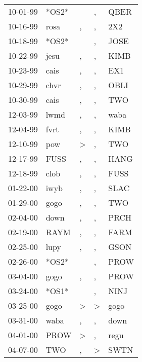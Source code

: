\begin{supertabular}{lllll}
 10-01-99 &  *OS2* &                  &                , &   QBER \\
 10-16-99 &   rosa &                , &                , &    2X2 \\
 10-18-99 &  *OS2* &                  &                , &   JOSE \\
 10-22-99 &   jesu &                , &                , &   KIMB \\
 10-23-99 &   cais &                , &                , &    EX1 \\
 10-29-99 &   chvr &                , &                , &   OBLI \\
 10-30-99 &   cais &                , &                , &    TWO \\
 12-03-99 &   lwmd &                , &                , &   waba \\
 12-04-99 &   fvrt &                , &                , &   KIMB \\
 12-10-99 &    pow &     \textgreater &                , &    TWO \\
 12-17-99 &   FUSS &                , &                , &   HANG \\
 12-18-99 &   clob &                , &                , &   FUSS \\
 01-22-00 &   iwyb &                , &                , &   SLAC \\
 01-29-00 &   gogo &                , &                , &    TWO \\
 02-04-00 &   down &                , &                , &   PRCH \\
 02-19-00 &   RAYM &                , &                , &   FARM \\
 02-25-00 &   lupy &                , &                , &   GSON \\
 02-26-00 &  *OS2* &                  &                , &   PROW \\
 03-04-00 &   gogo &                , &                , &   PROW \\
 03-24-00 &  *OS1* &                  &                , &   NINJ \\
 03-25-00 &   gogo &     \textgreater &     \textgreater &   gogo \\
 03-31-00 &   waba &                , &                , &   down \\
 04-01-00 &   PROW &     \textgreater &                , &   regu \\
 04-07-00 &    TWO &                , &     \textgreater &   SWTN \\

\end{supertabular}

